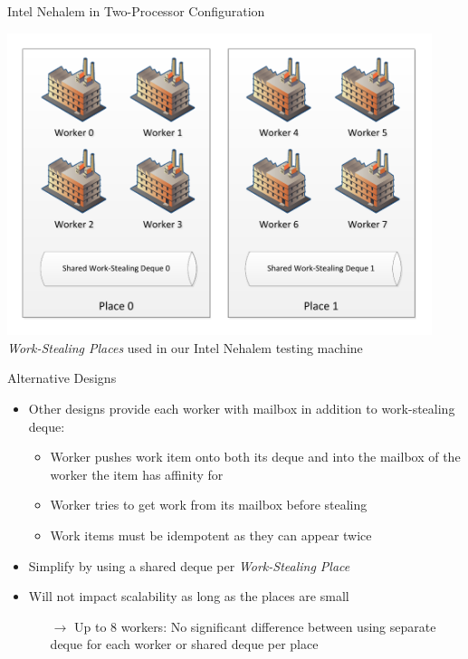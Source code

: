 \begin{frame}{Intel Nehalem in Two-Processor Configuration}
  \begin{center}
    \includegraphics[width=0.93\textwidth]{figures/places} \\
    \tiny{\emph{Work-Stealing Places} used in our Intel Nehalem
      testing machine}
  \end{center}
\end{frame}


\begin{frame}{Alternative Designs}
  \begin{itemize}
  \item Other designs provide each worker with mailbox in addition to
    work-stealing deque:
    \begin{itemize}
    \item Worker pushes work item onto both its deque and into the
      mailbox of the worker the item has affinity for
    \item Worker tries to get work from its mailbox before stealing
    \item Work items must be idempotent as they can appear twice
    \end{itemize}
  \item Simplify by using a shared deque per \emph{Work-Stealing
      Place}
  \item Will not impact scalability as long as the places are small
    \begin{itemize}
    \item[$\rightarrow$] Up to 8 workers: No significant difference
      between using separate deque for each worker or shared deque per
      place
    \end{itemize}
  \end{itemize}
\end{frame}

